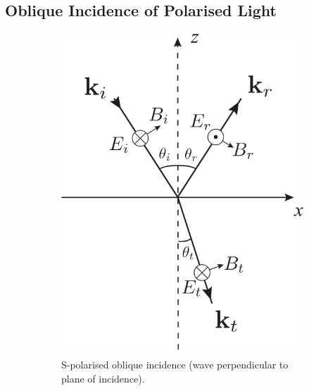 \documentclass{book}
\begin{document}
\subsection{Oblique Incidence of Polarised Light}
\begin{figure}[h]
	\centering
	\begin{subfigure}{0.4\textwidth}
		\includegraphics[width=0.9\linewidth]{S-polar.png}
		\caption{S-polarised oblique incidence (wave perpendicular to plane of incidence).}
	\end{subfigure}
	\begin{subfigure}{0.4\textwidth}

\end{subfigure}
\end{figure}
\end{document}
